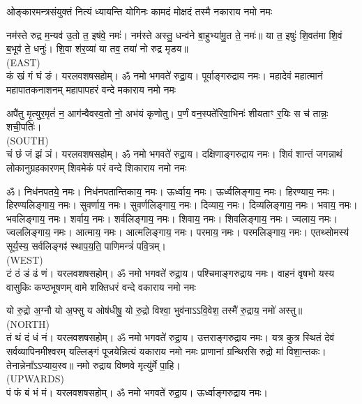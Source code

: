 


\twolineshloka
{ओङ्कारमन्त्रसंयुक्तं नित्यं ध्यायन्ति योगिनः}
{कामदं मोक्षदं तस्मै नकाराय नमो नमः}

नम॑स्ते रुद्र म॒न्यव॑ उ॒तो त॒ इष॑वे॒ नमः॑। नम॑स्ते अस्तु॒ धन्व॑ने बा॒हुभ्या॑मु॒त ते॒ नमः॑॥ या त॒ इषुः॑ शि॒वत॑मा शि॒वं ब॒भूव॑ ते॒ धनुः॑। शि॒वा श॑र॒व्या॑ या तव॒ तया॑ नो रुद्र मृडय॥\\
{\scriptsize (EAST)}\\
कं खं गं घं ङं। यरलवशषसहोम्। ॐ नमो भगवते॑ रुद्रा॒य। पूर्वाङ्गरुद्राय नमः। 
\medskip
\twolineshloka
{महादेवं महात्मानं महापातकनाशनम्}
{महापापहरं वन्दे मकाराय नमो नमः}

अपै॑तु मृ॒त्युर॒मृतं॑ न॒ आग॑न्वैवस्व॒तो नो॒ अभ॑यं कृणोतु।
प॒र्णं वन॒स्पते॑रिवा॒भिनः॑ शीयताꣳ र॒यिः स च॑ तान्नः॒ शची॒पतिः॑।\\
{\scriptsize (SOUTH)}\\
चं छं जं झं ञं। यरलवशषसहोम्। ॐ नमो भगवते॑ रुद्रा॒य। दक्षिणाङ्गरुद्राय नमः।
\medskip
\twolineshloka
{शिवं शान्तं जगन्नाथं लोकानुग्रहकारणम्}
{शिवमेकं परं वन्दे शिकाराय नमो नमः}

ॐ। निध॑नपतये॒ नमः। निध॑नपतान्तिकाय॒ नमः। ऊर्ध्वाय॒ नमः। ऊर्ध्वलिङ्गाय॒ नमः। हिरण्याय॒ नमः। हिरण्यलिङ्गाय॒ नमः। सुवर्णाय॒ नमः। सुवर्णलिङ्गाय॒ नमः। दिव्याय॒ नमः। दिव्यलिङ्गाय॒ नमः। भवाय॒ नमः। भवलिङ्गाय॒ नमः। शर्वाय॒ नमः। शर्वलिङ्गाय॒ नमः। शिवाय॒ नमः। शिवलिङ्गाय॒ नमः। ज्वलाय॒ नमः। ज्वललिङ्गाय॒ नमः। आत्माय॒ नमः। आत्मलिङ्गाय॒ नमः। परमाय॒ नमः। परमलिङ्गाय॒ नमः। एतथ्सोमस्य॑ सूर्य॒स्य॒ सर्वलिङ्गꣴ॑ स्थाप॒य॒ति॒ पाणिमन्त्रं॑ पवि॒त्रम्।\\
{\scriptsize (WEST)}\\
टं ठं डं ढं णं। यरलवशषसहोम्। ॐ नमो भगवते॑ रुद्रा॒य। पश्चिमाङ्गरुद्राय नमः।
\medskip
\twolineshloka
{वाहनं वृषभो यस्य वासुकिः कण्ठभूषणम्}
{वामे शक्तिधरं वन्दे वकाराय नमो नमः}

यो रु॒द्रो अ॒ग्नौ यो अ॒फ्सु य ओष॑धीषु॒ यो रु॒द्रो विश्वा॒ भुव॑नाऽऽवि॒वेश॒ तस्मै॑ रु॒द्राय॒ नमो॑ अस्तु॥\\
{\scriptsize (NORTH)}\\
तं थं दं धं नं। यरलवशषसहोम्। ॐ नमो भगवते॑ रुद्रा॒य। उत्तराङ्गरुद्राय नमः।
\medskip
\twolineshloka
{यत्र कुत्र स्थितं देवं सर्वव्यापिनमीश्वरम्}
{यल्लिङ्गं पूजयेन्नित्यं यकाराय नमो नमः}
प्राणानां ग्रन्थिरसि रुद्रो मा॑ विशा॒न्तकः। तेनान्नेना᳚\-ऽऽप्याय॒स्व॥ नमो रुद्राय विष्णवे मृत्यु॑र्मे पा॒हि।\\
{\scriptsize (UPWARDS)}\\
पं फं बं भं मं। यरलवशषसहोम्। ॐ नमो भगवते॑ रुद्रा॒य। ऊर्ध्वाङ्गरुद्राय नमः।

